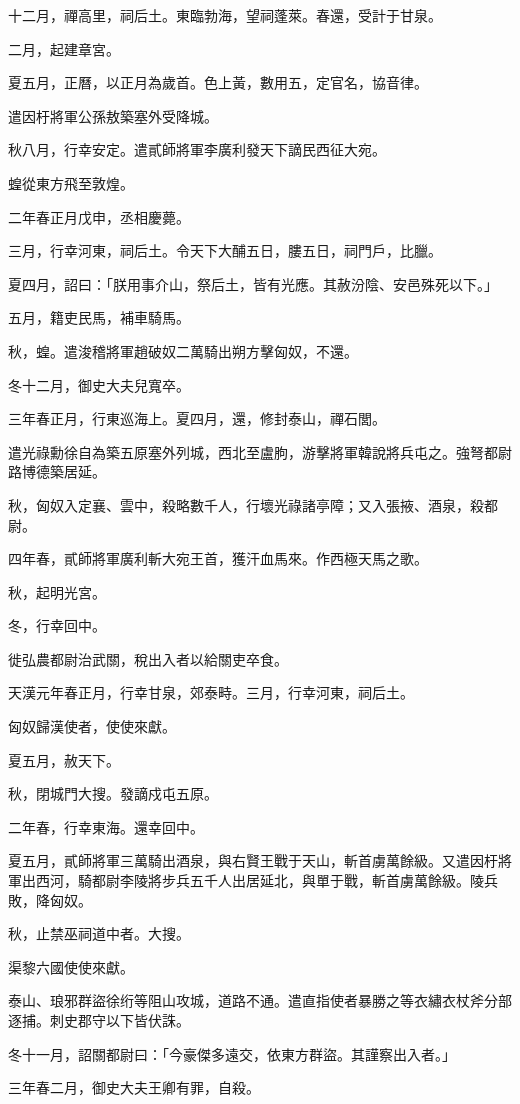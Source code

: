 \begin{pinyinscope}
十二月，禪高里，祠后土。東臨勃海，望祠蓬萊。春還，受計于甘泉。

二月，起建章宮。

夏五月，正曆，以正月為歲首。色上黃，數用五，定官名，協音律。

遣因杅將軍公孫敖築塞外受降城。

秋八月，行幸安定。遣貳師將軍李廣利發天下謫民西征大宛。

蝗從東方飛至敦煌。

二年春正月戊申，丞相慶薨。

三月，行幸河東，祠后土。令天下大酺五日，膢五日，祠門戶，比臘。

夏四月，詔曰：「朕用事介山，祭后土，皆有光應。其赦汾陰、安邑殊死以下。」

五月，籍吏民馬，補車騎馬。

秋，蝗。遣浚稽將軍趙破奴二萬騎出朔方擊匈奴，不還。

冬十二月，御史大夫兒寬卒。

三年春正月，行東巡海上。夏四月，還，修封泰山，禪石閭。

遣光祿勳徐自為築五原塞外列城，西北至盧朐，游擊將軍韓說將兵屯之。強弩都尉路博德築居延。

秋，匈奴入定襄、雲中，殺略數千人，行壞光祿諸亭障；又入張掖、酒泉，殺都尉。

四年春，貳師將軍廣利斬大宛王首，獲汗血馬來。作西極天馬之歌。

秋，起明光宮。

冬，行幸回中。

徙弘農都尉治武關，稅出入者以給關吏卒食。

天漢元年春正月，行幸甘泉，郊泰畤。三月，行幸河東，祠后土。

匈奴歸漢使者，使使來獻。

夏五月，赦天下。

秋，閉城門大搜。發謫戍屯五原。

二年春，行幸東海。還幸回中。

夏五月，貳師將軍三萬騎出酒泉，與右賢王戰于天山，斬首虜萬餘級。又遣因杅將軍出西河，騎都尉李陵將步兵五千人出居延北，與單于戰，斬首虜萬餘級。陵兵敗，降匈奴。

秋，止禁巫祠道中者。大搜。

渠黎六國使使來獻。

泰山、琅邪群盜徐绗等阻山攻城，道路不通。遣直指使者暴勝之等衣繡衣杖斧分部逐捕。刺史郡守以下皆伏誅。

冬十一月，詔關都尉曰：「今豪傑多遠交，依東方群盜。其謹察出入者。」

三年春二月，御史大夫王卿有罪，自殺。


\end{pinyinscope}
